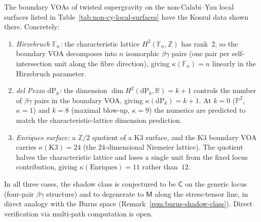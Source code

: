 \begin{conjecture}
\label{conj:non-cy-local-surfaces}
The boundary VOAs of twisted supergravity on the non-Calabi--Yau
local surfaces listed in Table~\textup{\ref{tab:non-cy-local-surfaces}}
have the Koszul data shown there. Concretely:
\begin{enumerate}[label=\textup{(\roman*)},nosep]
\item \emph{Hirzebruch $\mathbb{F}_n$:} the characteristic lattice
 $H^{2}(\mathbb{F}_n, \mathbb{Z})$ has rank~$2$, so the boundary
 VOA decomposes into $n$ isomorphic $\beta\gamma$ pairs
 \textup{(}one pair per self-intersection unit along the fibre
 direction\textup{)}, giving
 $\kappa(\mathbb{F}_n) = n$ linearly in the Hirzebruch parameter.
\item \emph{del Pezzo $\mathrm{dP}_k$:} the dimension
 $\dim H^{2}(\mathrm{dP}_k, \mathbb{R}) = k + 1$ controls the
 number of $\beta\gamma$ pairs in the boundary VOA, giving
 $\kappa(\mathrm{dP}_k) = k + 1$. At $k = 0$ \textup{(}$\mathbb{P}^2$,
 $\kappa = 1$\textup{)} and $k = 8$ \textup{(}maximal blow-up,
 $\kappa = 9$\textup{)} the numerics are predicted to match the
 characteristic-lattice dimension prediction.
\item \emph{Enriques surface:} a $\mathbb{Z}/2$ quotient of a K3 surface,
 and the K3 boundary VOA carries $\kappa(\mathrm{K3}) = 24$
 \textup{(}the $24$-dimensional Niemeier lattice\textup{)}. The
 quotient halves the characteristic lattice and loses a single unit
 from the fixed locus contribution, giving
 $\kappa(\mathrm{Enriques}) = 11$ rather than~$12$.
\end{enumerate}
In all three cases, the shadow class is conjectured to be
$\mathsf{C}$ on the generic locus \textup{(}four-pair $\beta\gamma$
structure\textup{)} and to degenerate to $\mathsf{M}$ along the
stress-tensor line, in direct analogy with the Burns space
\textup{(}Remark~\textup{\ref{rem:burns-shadow-class}}\textup{)}.
Direct verification via multi-path computation is open.
\end{conjecture}

